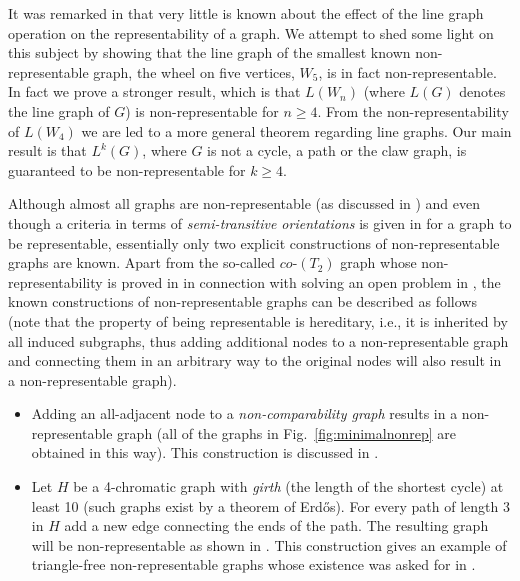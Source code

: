 \documentclass[12pt]{article}
\begin{document}
It was remarked in \cite{HKP1} that very little is known about the effect of the line graph operation on the representability of a graph. We attempt to shed some light on this subject by showing that the line graph of the smallest known non-representable graph, the wheel on five vertices, $W_5$, is in fact non-representable. In fact we prove a stronger result, which is that $L(W_n)$ (where $L(G)$ denotes the line graph of $G$) is non-representable for $n \geqslant 4$. From the non-representability of $L(W_4)$ we are led to a more general theorem regarding line graphs. Our main result is that $L^k(G)$, where $G$ is not a cycle, a path or the claw graph, is guaranteed to be non-representable for $k \geqslant 4$. 





Although almost all graphs are non-representable (as discussed in \cite{KP}) and even though a criteria in terms of {\em semi-transitive orientations} is given in \cite{HKP1} for a graph to be representable, essentially only two explicit constructions of non-representable graphs are known. Apart from the so-called $co$-$(T_2)$ graph whose non-representability is proved in  \cite{HKP2} in connection with solving an open problem in \cite{KP}, the known constructions of non-representable graphs can be described as follows (note that the property of being representable is hereditary, i.e., it is inherited by all induced subgraphs, thus adding additional nodes to a non-representable graph and connecting them in an arbitrary way to the original nodes will also result in a non-representable graph).

\begin{itemize}
\item Adding an all-adjacent node to a {\em non-comparability graph} results in a non-representable graph (all of the graphs in Fig.~\ref{fig:minimalnonrep} are obtained in this way). This construction is discussed in \cite{KP}.
\item Let $H$ be a 4-chromatic graph with {\em girth} (the length of the shortest cycle) at least 10 (such graphs exist by a theorem of Erd\H{o}s).
For every path of length 3 in $H$ add a new edge connecting the ends of the path. The resulting graph will be non-representable as shown in \cite{HKP1}. This construction gives an example of triangle-free non-representable graphs whose existence was asked for in \cite{KP}.
\end{itemize}
\end{document}
